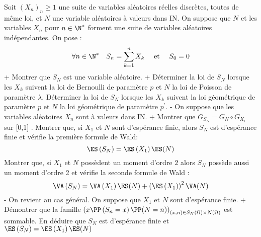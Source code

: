 \begin{exercise}[title=Somme aléatoire de variables aléatoires]
Soit $\left(X_{n}\right)_{n} \geqslant 1$ une suite de variables aléatoires réelles discrètes, toutes de même loi, et $N$ une variable aléatoires à valeurs dans IN. On suppose que $N$ et les variables $X_{n}$ pour $n \in \N^{*}$ forment une suite de variables aléatoires indépendantes. On pose :
\begin{equation*}
\forall n \in \N^{*} \quad S_{n}=\sum_{k=1}^{n} X_{k} \quad \text { et } \quad S_{0}=0
\end{equation*}
\question+ Montrer que $S_{N}$ est une variable aléatoire.
\question\question+ Déterminer la loi de $S_{N}$ lorsque les $X_{k}$ suivent la loi de Bernoulli de paramètre $p$ et $N$ la loi de Poisson de paramètre $\lambda$.
\question Déterminer la loi de $S_{N}$ lorsque les $X_{k}$ suivent la loi géométrique de paramètre $p$ et $N$ la loi géométrique de paramètre $p^{\prime}$.
\question- On suppose que les variables aléatoires $X_{n}$ sont à valeurs dans IN.
\question+ Montrer que $G_{S_{N}}=G_{N} \circ G_{X_{1}}$ sur [0,1] .
\question Montrer que, si $X_{1}$ et $N$ sont d'espérance finie, alors $S_{N}$ est d'espérance finie et vérifie la première formule de Wald:
\begin{equation*}
\ES\left(S_{N}\right)=\ES\left(X_{1}\right) \ES(N)
\end{equation*}
\question Montrer que, si $X_{1}$ et $N$ possèdent un moment d'ordre $2$ alors $S_{N}$ possède aussi un moment d'ordre 2 et vérifie la seconde formule de Wald :
\begin{equation*}
\VA\left(S_{N}\right)=\VA\left(X_{1}\right) \ES(N)+\left(\ES\left(X_{1}\right)\right)^{2} \VA(N)
\end{equation*}
\question- On revient au cas général. On suppose que $X_{1}$ et $N$ sont d'espérance finie.
\question+ Démontrer que la famille $\left(x \PP\left(S_{n}=x\right) \PP(N=n)\right)_{(x, n) \in S_{N}(\Omega) \times N(\Omega)}$ est sommable.
\question En déduire que $S_{N}$ est d'espérance finie et
$\ES\left(S_{N}\right)=\ES\left(X_{1}\right) \ES(N)$
\endquestions 
\end{exercise}


